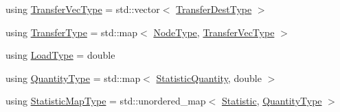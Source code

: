 \begin{DoxyCompactItemize}
\item 
using \hyperlink{structvt_1_1vrt_1_1collection_1_1lb_1_1_base_l_b_a329e8179ec41a1bd4924c79fe23a79af}{Transfer\+Vec\+Type} = std\+::vector$<$ \hyperlink{structvt_1_1vrt_1_1collection_1_1lb_1_1_base_l_b_add886785f64ea725005f1263fd1393be}{Transfer\+Dest\+Type} $>$
\item 
using \hyperlink{structvt_1_1vrt_1_1collection_1_1lb_1_1_base_l_b_a0a5f834082d85c558bdaf84c464c1ead}{Transfer\+Type} = std\+::map$<$ \hyperlink{namespacevt_a866da9d0efc19c0a1ce79e9e492f47e2}{Node\+Type}, \hyperlink{structvt_1_1vrt_1_1collection_1_1lb_1_1_base_l_b_a329e8179ec41a1bd4924c79fe23a79af}{Transfer\+Vec\+Type} $>$
\item 
using \hyperlink{structvt_1_1vrt_1_1collection_1_1lb_1_1_base_l_b_a215e22b9f12678303f49615ae3be05cc}{Load\+Type} = double
\item 
using \hyperlink{structvt_1_1vrt_1_1collection_1_1lb_1_1_base_l_b_a3f57312926295ad8d55bbe6d8d74e5a1}{Quantity\+Type} = std\+::map$<$ \hyperlink{namespacevt_1_1vrt_1_1collection_1_1lb_a74989c7b4dd16fcc067e90a29cd1febe}{Statistic\+Quantity}, double $>$
\item 
using \hyperlink{structvt_1_1vrt_1_1collection_1_1lb_1_1_base_l_b_a6e8dead5546b2054f604ca258e1e815e}{Statistic\+Map\+Type} = std\+::unordered\+\_\+map$<$ \hyperlink{namespacevt_1_1vrt_1_1collection_1_1lb_af0e20ef9afee77295053aa83bf1348b1}{Statistic}, \hyperlink{structvt_1_1vrt_1_1collection_1_1lb_1_1_base_l_b_a3f57312926295ad8d55bbe6d8d74e5a1}{Quantity\+Type} $>$
\end{DoxyCompactItemize}
